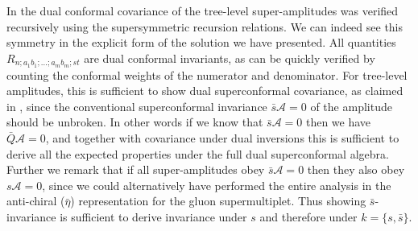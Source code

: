 \documentclass[12pt]{article}
\begin{document}
{In \cite{Brandhuber:2008pf} the dual conformal covariance of the
tree-level super-amplitudes was verified recursively using the
supersymmetric recursion relations. We can indeed see this symmetry in
the explicit form of the solution we have presented. All quantities
$R_{n;a_1b_1;...;a_mb_m;st}$ are dual conformal invariants, as can
be quickly verified by counting the conformal weights of the numerator
and denominator. For tree-level amplitudes, this is sufficient to show
dual superconformal covariance, as claimed in
\cite{Brandhuber:2008pf}, since the conventional
superconformal invariance $\bar s \mathcal{A}=0$ of the amplitude
should be unbroken. In
other words if we know that $\bar s \mathcal{A} = 0$ then we have $\bar
Q \mathcal{A} =0$, and together with covariance under dual inversions
this is sufficient to derive all the expected
properties under the full dual superconformal algebra. Further we
remark that if all super-amplitudes obey $\bar s \mathcal{A} =0$ then
they also obey $s \mathcal{A} =0$, since we could alternatively have
performed the entire analysis in the anti-chiral ($\bar \eta$)
representation for the gluon supermultiplet. Thus showing $\bar
s$-invariance is sufficient to derive invariance under $s$ and
therefore under $k=\{s,\bar s\}$.

}
\end{document}
